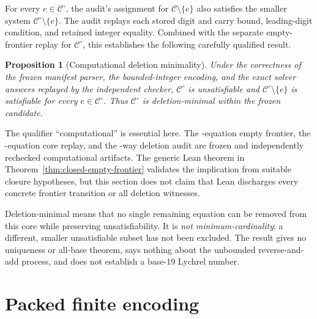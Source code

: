 \documentclass[11pt,twoside]{article}
\newtheorem{proposition}[definition]{Proposition}
\theoremstyle{remark}
\newcommand{\Candidate}{\ensuremath{\mathcal{C}}}
\newcommand{\Core}{\ensuremath{\mathcal{C}^{\circ}}}
\begin{document}
For every $e\in\Core$, the audit's assignment for
$\Candidate\setminus\{e\}$ also satisfies the smaller system
$\Core\setminus\{e\}$.  The audit replays each stored digit and carry bound,
leading-digit condition, and retained integer equality.  Combined with the
separate empty-frontier replay for $\Core$, this establishes the following
carefully qualified result.

\begin{proposition}[Computational deletion minimality]
\label{prop:deletion-minimality}
Under the correctness of the frozen manifest parser, the bounded-integer
encoding, and the exact solver answers replayed by the independent checker,
$\Core$ is unsatisfiable and $\Core\setminus\{e\}$ is satisfiable for every
$e\in\Core$.  Thus $\Core$ is deletion-minimal within the frozen candidate.
\end{proposition}

The qualifier ``computational'' is essential here.  The
\CandidateEquationCount-equation empty frontier, the
\CoreEquationCount-equation core replay, and the
\DeletionAuditCount-way deletion audit are frozen and independently rechecked
computational artifacts.  The generic Lean theorem in
Theorem~\ref{thm:closed-empty-frontier} validates the implication from
suitable closure hypotheses, but this section does not claim that Lean
discharges every concrete frontier transition or all deletion witnesses.

\begin{nonclaim}
Deletion-minimal means that no single remaining equation can be removed from
this core while preserving unsatisfiability.  It is \emph{not
minimum-cardinality}: a different, smaller unsatisfiable subset has not been
excluded.  The result gives no uniqueness or all-base theorem, says nothing
about the unbounded reverse-and-add process, and does not establish a base-19
Lychrel number.
\end{nonclaim}

\section{Packed finite encoding}
\label{sec:packed-encoding}
\end{document}
